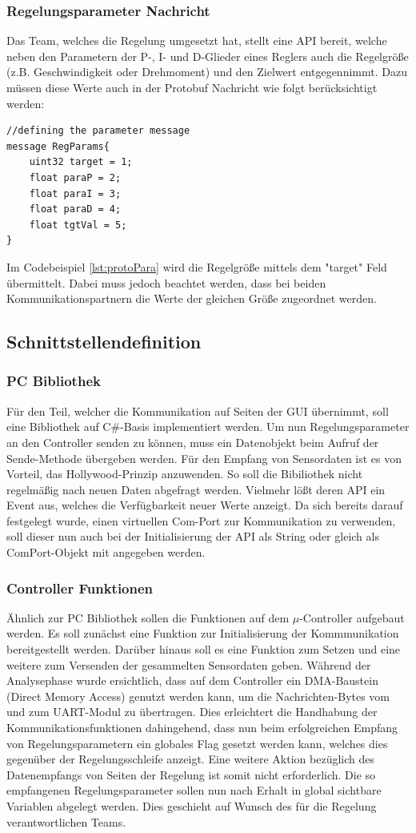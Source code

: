 \subsubsection{Regelungsparameter Nachricht}
Das Team, welches die Regelung umgesetzt hat, stellt eine API bereit, welche neben den Parametern der P-, I- und D-Glieder eines Reglers auch die Regelgröße (z.B. Geschwindigkeit oder Drehmoment) und den Zielwert entgegennimmt. Dazu müssen diese Werte auch in der Protobuf Nachricht wie folgt berücksichtigt werden:
\begin{lstlisting}[caption=Beschreibung der Parameter Nachricht, label=lst:protoPara]
//defining the parameter message
message RegParams{
	uint32 target = 1;
	float paraP = 2;
	float paraI = 3;
	float paraD = 4;
	float tgtVal = 5;
}
\end{lstlisting}
Im Codebeispiel \ref{lst:protoPara} wird die Regelgröße mittels dem "target" Feld übermittelt. Dabei muss jedoch beachtet werden, dass bei beiden Kommunikationspartnern die Werte der gleichen Größe zugeordnet werden.
\subsection{Schnittstellendefinition}
\subsubsection{PC Bibliothek}
Für den Teil, welcher die Kommunikation auf Seiten der GUI übernimmt, soll eine Bibliothek auf C\#-Basis implementiert werden. Um nun Regelungsparameter an den Controller senden zu können, muss ein Datenobjekt beim Aufruf der Sende-Methode übergeben werden. Für den Empfang von Sensordaten ist es von Vorteil, das Hollywood-Prinzip anzuwenden. So soll die Bibiliothek nicht regelmäßig nach neuen Daten abgefragt werden. Vielmehr lößt deren API ein Event aus, welches die Verfügbarkeit neuer Werte anzeigt. Da sich bereits darauf festgelegt wurde, einen virtuellen Com-Port zur Kommunikation zu verwenden, soll dieser nun auch bei der Initialisierung der API als String oder gleich als ComPort-Objekt mit angegeben werden. 
\subsubsection{Controller Funktionen}
Ähnlich zur PC Bibliothek sollen die Funktionen auf dem $\mu$-Controller aufgebaut werden. Es soll zunächst eine Funktion zur Initialisierung der Kommmunikation bereitgestellt werden. Darüber hinaus soll es eine Funktion zum Setzen und eine weitere zum Versenden der gesammelten Sensordaten geben. Während der Analysephase wurde ersichtlich, dass auf dem Controller ein DMA-Baustein (Direct Memory Access) genutzt werden kann, um die Nachrichten-Bytes vom und zum UART-Modul zu übertragen. Dies erleichtert die Handhabung der Kommunikationsfunktionen dahingehend, dass nun beim erfolgreichen Empfang von Regelungsparametern ein globales Flag gesetzt werden kann, welches dies gegenüber der Regelungsschleife anzeigt. Eine weitere Aktion bezüglich des Datenempfangs von Seiten der Regelung ist somit nicht erforderlich. Die so empfangenen Regelungsparameter sollen nun nach Erhalt in global sichtbare Variablen abgelegt werden. Dies geschieht auf Wunsch des für die Regelung verantwortlichen Teams.
